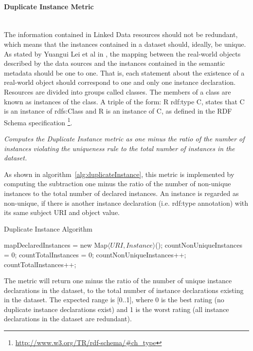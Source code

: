 {{\paragraph{Duplicate Instance Metric} ~\\
The information contained in Linked Data resources should not be redundant, which means that the instances contained in a dataset should, ideally, be unique. As stated by Yuangui Lei et al in \cite{Lei2007}, the mapping between the real-world objects described by the data sources and the instances contained in the semantic metadata should be one to one. That is, each statement about the existence of a real-world object should correspond to one and only one instance declaration.
Resources are divided into groups called classes. The members of a class are known as instances of the class. A triple of the form: R rdf:type C, states that C is an instance of rdfs:Class and R is an instance of C, as defined in the RDF Schema specification \footnote{\url{http://www.w3.org/TR/rdf-schema/#ch_type}}.

\begin{mdframed}[style=metricdefinition]
\emph{Computes the Duplicate Instance metric as one minus the ratio of the number of instances violating the uniqueness rule to the total number of instances in the dataset.}
\end{mdframed}

As shown in algorithm~\ref{alg:duplicateInstance}, this metric is implemented by computing the subtraction one minus the ratio of the number of non-unique instances to the total number of declared instances. An instance is regarded as non-unique, if there is another instance declaration (i.e. rdf:type annotation) with its same subject URI and object value.
\begin{algorithm}
\caption{Duplicate Instance Algorithm} \label{alg:duplicateInstance}
\begin{algorithmic}[1]
\State mapDeclaredInstances = new Map$\langle URI, Instance\rangle$();
\State countNonUniqueInstances = 0;
\State countTotalInstances = 0;
\EndProcedure
{}
countNonUniqueInstances++; 
\EndIf
\State countTotalInstances++;  ~\\
\EndProcedure
\end{algorithmic}
\end{algorithm}
The metric will return one minus the ratio of the number of unique instance declarations in the dataset, to the total number of instance declarations existing in the dataset. The expected range is [0..1], where 0 is the best rating (no duplicate instance declarations exist) and 1 is the worst rating (all instance declarations in the dataset are redundant).

}}

